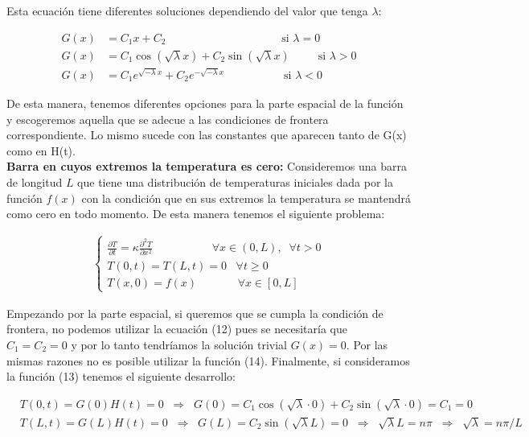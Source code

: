 \documentclass[12pt]{article}
\begin{document}
Esta ecuación tiene diferentes soluciones dependiendo del valor que tenga $\lambda$:

\begin{align}
    G(x) &= C_1x + C_2 \;\;\;\;\;\;\;\;\;\;\;\;\;\;\;\;\;\;\;\;\;\;\;\;\;\;\;\;\;\;\;\;\;\;\;\;\; \text{si }\lambda=0\\
    G(x) &= C_1\cos(\sqrt{\lambda}x) + C_2\sin(\sqrt{\lambda}x) \;\;\;\;\;\;\;\;\; \text{si }\lambda>0\\
    G(x) &= C_1e^{\sqrt{-\lambda}x} + C_2e^{-\sqrt{-\lambda}x} \;\;\;\;\;\;\;\;\;\;\;\;\;\;\;\;\;\;\; \text{si }\lambda<0
\end{align}

De esta manera, tenemos diferentes opciones para la parte espacial de la función y escogeremos aquella que se adecue a las condiciones de frontera correspondiente. Lo mismo sucede con las constantes que aparecen tanto de G(x) como en H(t). \\

\textbf{Barra en cuyos extremos la temperatura es cero:} Consideremos una barra de longitud $L$ que tiene una distribución de temperaturas iniciales dada por la función $f(x)$ con la condición que en sus extremos la temperatura se mantendrá como cero en todo momento. De esta manera tenemos el siguiente problema:

\begin{align}
    \begin{cases}
        \frac{\partial T}{\partial t} = \kappa \frac{\partial^2 T}{\partial x^2} \;\;\;\;\;\;\;\;\;\;\;\;\;\;\;\;\;\;\; \forall x\in (0,L), \;\; \forall t>0 \\
        T(0,t) = T(L,t) = 0 \;\;\; \forall t \geq 0 \\
        T(x,0) = f(x) \;\;\;\;\;\;\;\;\;\;\;\;\; \forall x\in [0,L]
    \end{cases}
\end{align}

Empezando por la parte espacial, si queremos que se cumpla la condición de frontera, no podemos utilizar la ecuación (12) pues se necesitaría que $C_1 = C_2 = 0$ y por lo tanto tendríamos la solución trivial $G(x) = 0$. Por las mismas razones no es posible utilizar la función (14). Finalmente, si consideramos la función (13) tenemos el siguiente desarrollo:

\begin{align*}
    &T(0,t) = G(0)H(t) = 0 \;\; \Rightarrow \;\; G(0) = C_1\cos(\sqrt{\lambda}\cdot 0) + C_2\sin(\sqrt{\lambda}\cdot 0) = C_1 = 0 \\
    &T(L,t) = G(L)H(t) = 0 \;\; \Rightarrow \;\; G(L) = C_2\sin(\sqrt{\lambda}L) = 0 \;\; \Rightarrow \;\; \sqrt{\lambda}L = n\pi \;\; \Rightarrow \;\; \sqrt{\lambda} = n\pi/L
\end{align*}
\end{document}
